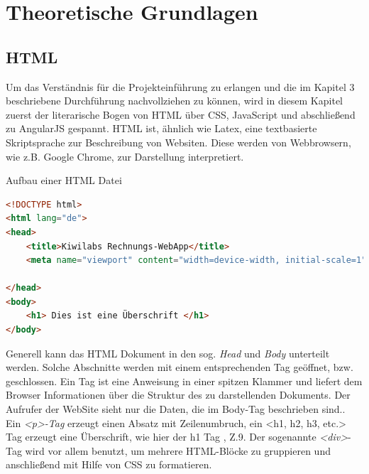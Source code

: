 \chapter{Theoretische Grundlagen}
\label{cha:Grundlagen}


\section{HTML}
\label{sec:HTML}

Um das Verständnis für die Projekteinführung zu erlangen und die im Kapitel 3 beschriebene Durchführung nachvollziehen zu können, wird in diesem Kapitel zuerst der literarische Bogen von \ac{HTML} über \ac{CSS}, JavaScript und abschließend zu AngularJS gespannt. \ac{HTML} ist, ähnlich wie Latex, eine textbasierte Skriptsprache zur Beschreibung von Websiten. Diese werden von Webbrowsern, wie z.B. Google Chrome, zur Darstellung interpretiert. 

\begin{description}
	\item[Aufbau einer HTML Datei]
    \hfill 
    \label{des:Aufbau_HTML}
\end{description}
%
\begin{lstlisting}[language=HTML]
<!DOCTYPE html>
<html lang="de">
<head>
    <title>Kiwilabs Rechnungs-WebApp</title>
    <meta name="viewport" content="width=device-width, initial-scale=1">

</head>
<body>
    <h1> Dies ist eine Überschrift </h1>
</body>
\end{lstlisting}

Generell kann das \ac{HTML} Dokument in den sog. \textit{Head} und \textit{Body} unterteilt werden. Solche Abschnitte werden mit einem entsprechenden Tag geöffnet, bzw. geschlossen. Ein Tag ist eine Anweisung in einer spitzen Klammer und liefert dem Browser Informationen über die Struktur des zu darstellenden Dokuments. Der Aufrufer der WebSite sieht nur die Daten, die im Body-Tag beschrieben sind.\cite{html_huberlin}. Ein \textit{<p>-Tag} erzeugt einen Absatz mit Zeilenumbruch, ein <h1, h2, h3, etc.> Tag erzeugt eine Überschrift, wie hier der h1 Tag , Z.9. 
Der sogenannte \textit{<div>}-Tag wird vor allem benutzt, um mehrere \ac{HTML}-Blöcke zu gruppieren und anschließend mit Hilfe von \ac{CSS} zu formatieren.

